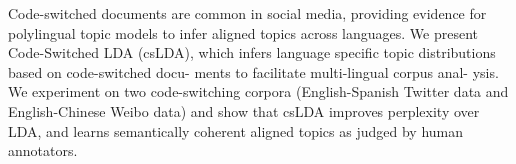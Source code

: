 Code-switched documents are common in social media, providing evidence for polylingual topic models to infer aligned topics across languages. We present Code-Switched LDA (csLDA), which infers language specific topic distributions based on code-switched docu- ments to facilitate multi-lingual corpus anal- ysis. We experiment on two code-switching corpora (English-Spanish Twitter data and English-Chinese Weibo data) and show that csLDA improves perplexity over LDA, and learns semantically coherent aligned topics as judged by human annotators.
